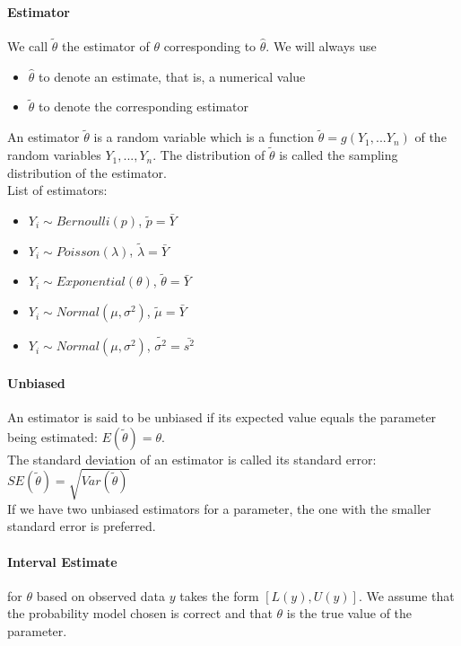 \documentclass[12pt]{report}
\begin{document}
    \paragraph{Estimator} We call $\tilde{\theta}$ the estimator of $\theta$
    corresponding to $\hat{\theta}$. We will always use
    \begin{itemize}
      \item $\hat{\theta}$ to denote an estimate, that is, a numerical value
      \item $\tilde{\theta}$ to denote the corresponding estimator
    \end{itemize}
    An estimator $\tilde{\theta}$ is a random variable which is a function
    $\tilde{\theta} = g(Y_1, ... Y_n)$ of the random variables $Y_1, ... ,
    Y_n$. The distribution of $\tilde{\theta}$ is called the sampling
    distribution of the estimator.\\
    List of estimators:
    \begin{itemize}
      \item $Y_i \sim Bernoulli(p)$, $\tilde{p} = \bar{Y}$
      \item $Y_i \sim Poisson(\lambda)$, $\tilde{\lambda} = \bar{Y}$
      \item $Y_i \sim Exponential(\theta)$, $\tilde{\theta} = \bar{Y}$
      \item $Y_i \sim Normal(\mu, \sigma^2)$, $\tilde{\mu} = \bar{Y}$
      \item $Y_i \sim Normal(\mu, \sigma^2)$, $\tilde{\sigma^2} = \bar{s^2}$
    \end{itemize}

    \paragraph{Unbiased} An estimator is said to be unbiased if its expected
    value equals the parameter being estimated: $E(\tilde{\theta}) = \theta$.\\
    The standard deviation of an estimator is called its standard error:
    $SE(\tilde{\theta}) = \sqrt{Var(\tilde{\theta})}$\\
    If we have two unbiased estimators for a parameter, the one with the
    smaller standard error is preferred.

    \paragraph{Interval Estimate} for $\theta$ based on observed data $y$ takes
    the form $[L(y), U(y)]$. We assume that the probability model chosen is
    correct and that $\theta$ is the true value of the parameter.
\end{document}
